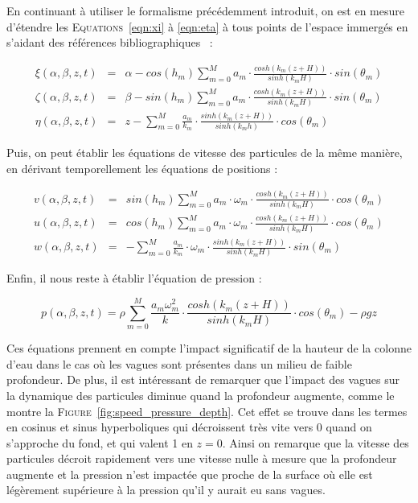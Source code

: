 				En continuant à utiliser le formalisme précédemment introduit, on est en mesure d'étendre les \textsc{Equations}~\ref{eqn:xi} à \ref{eqn:eta} à tous points de l'espace immergés en s'aidant des références bibliographiques~\cite{dean1991water, MIT_Waves} :

				\begin{eqnarray}
					\xi(\alpha, \beta, z, t) & = & \alpha - cos(h_m) \sum_{m=0}^{M} a_m \cdot \frac{cosh(k_m(z+H))}{sinh(k_m H)} \cdot sin(\theta_m) \\
					\zeta(\alpha, \beta, z, t) & = & \beta - sin(h_m) \sum_{m=0}^{M} a_m \cdot \frac{cosh(k_m(z+H))}{sinh(k_m H)} \cdot sin(\theta_m) \\
					\eta(\alpha, \beta, z, t) & = & z - \sum_{m=0}^{M} \frac{a_m}{k_m} \cdot \frac{sinh(k_m(z+H))}{sinh(k_mh)} \cdot cos(\theta_m)
				\end{eqnarray}

				Puis, on peut établir les équations de vitesse des particules de la même manière, en dérivant temporellement les équations de positions :
		
				\begin{eqnarray}
					v(\alpha, \beta, z, t) & = & sin(h_m) \sum_{m=0}^{M} a_m \cdot \omega_m \cdot \frac{cosh(k_m(z+H))}{sinh(k_m H)} \cdot cos(\theta_m) \\
					u(\alpha, \beta, z, t) & = & cos(h_m) \sum_{m=0}^{M} a_m \cdot \omega_m \cdot \frac{cosh(k_m(z+H))}{sinh(k_m H)} \cdot cos(\theta_m) \\
					w(\alpha, \beta, z, t) & = & - \sum_{m=0}^{M} \frac{a_m}{k_m} \cdot \omega_m \cdot \frac{sinh(k_m(z+H))}{sinh(k_m H)} \cdot sin(\theta_m)
				\end{eqnarray}

				Enfin, il nous reste à établir l'équation de pression :

				\begin{equation}
					p(\alpha, \beta, z, t) = \rho \sum_{m=0}^{M} \frac{a_m\omega_m^2}{k} \cdot \frac{cosh(k_m(z+H))}{sinh(k_m H)} \cdot cos(\theta_m) - \rho g z
				\end{equation}

				Ces équations prennent en compte l'impact significatif de la hauteur de la colonne d'eau dans le cas où les vagues sont présentes dans un milieu de faible profondeur. De plus, il est intéressant de remarquer que l'impact des vagues sur la dynamique des particules diminue quand la profondeur augmente, comme le montre la \textsc{Figure}~\ref{fig:speed_pressure_depth}. Cet effet se trouve dans les termes en cosinus et sinus hyperboliques qui décroissent très vite vers 0 quand on s'approche du fond, et qui valent 1 en $z=0$. Ainsi on remarque que la vitesse des particules décroit rapidement vers une vitesse nulle à mesure que la profondeur augmente et la pression n'est impactée que proche de la surface où elle est légèrement supérieure à la pression qu'il y aurait eu sans vagues.

